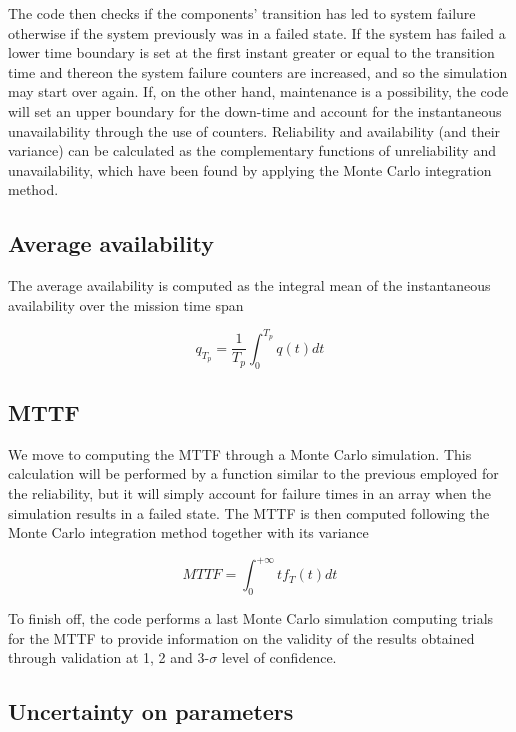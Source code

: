 \documentclass[a4paper,11pt]{article}
\begin{document}
\hspace{2em}

The code then checks if the components' transition has led to system failure
otherwise if the system previously was in a failed state. If the system has
failed a lower time boundary is set at the first instant greater or equal to the
transition time and thereon the system failure counters are increased, and so
the simulation may start over again. If, on the other hand, maintenance is a
possibility, the code will set an upper boundary for the down-time and account
for the instantaneous unavailability through the use of counters. Reliability
and availability (and their variance) can be calculated as the complementary
functions of unreliability and unavailability, which have been found by applying
the Monte Carlo integration method.

\subsection{Average availability}

The average availability is computed as the integral mean of the instantaneous
availability over the mission time span

\begin{equation}
    q_{T_p} = \frac{1}{T_p} \int_0^{T_p}q(t)dt
\end{equation}

\subsection{MTTF}

We move to computing the MTTF through a Monte Carlo simulation. This calculation
will be performed by a function similar to the previous employed for the
reliability, but it will simply account for failure times in an array when the
simulation results in a failed state. The MTTF is then computed following the
Monte Carlo integration method together with its variance

\begin{equation}
    MTTF = \int_0^{+\infty}tf_T(t)dt
\end{equation}

To finish off, the code performs a last Monte Carlo simulation computing trials
for the MTTF to provide information on the validity of the results obtained
through validation at 1, 2 and 3-$\sigma$ level of confidence.

\subsection{Uncertainty on parameters}
\end{document}
